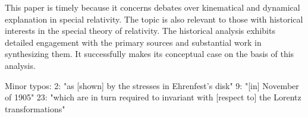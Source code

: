 \documentclass[submitted,11pt]{article}
\begin{document}
This paper is timely because it concerns debates over kinematical and dynamical
explanation in special relativity.  The topic is also relevant to those with
historical interests in the special theory of relativity.  The historical
analysis exhibits detailed engagement with the primary sources and substantial
work in synthesizing them.  It successfully makes its conceptual case on the
basis of this analysis.

Minor typos:
2: "as [shown] by the stresses in Ehrenfest's disk"
9: "[in] November of 1905"
23: "which are in turn required to invariant with [respect to] the Lorentz
transformations"
\end{document}
